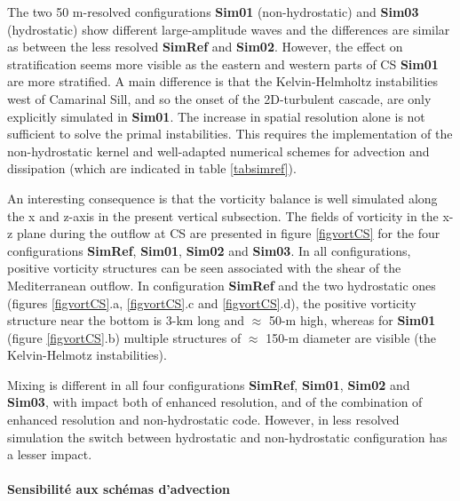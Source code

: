 The two 50 m-resolved configurations \textbf{Sim01} (non-hydrostatic) and \textbf{Sim03} (hydrostatic) show different large-amplitude waves and the differences are similar as between the less resolved \textbf{SimRef} and \textbf{Sim02}. However, the effect on stratification seems more visible as the eastern and western parts of CS \textbf{Sim01} are more stratified. A main difference is that the Kelvin-Helmholtz instabilities west of Camarinal Sill, and so the onset of the 2D-turbulent cascade, are only explicitly simulated in \textbf{Sim01}.
The increase in spatial resolution alone is not sufficient to solve the primal instabilities. This requires the implementation of the non-hydrostatic kernel and well-adapted numerical schemes for advection and dissipation (which are indicated in table \ref{tabsimref}).
 
An interesting consequence is that the vorticity balance is well simulated along the x and z-axis in the present vertical subsection. The fields of vorticity in the x-z plane during the outflow at CS are presented in figure \ref{figvortCS} for the four configurations \textbf{SimRef}, \textbf{Sim01}, \textbf{Sim02} and \textbf{Sim03}. In all configurations, positive vorticity structures can be seen associated with the shear of the Mediterranean outflow. In configuration \textbf{SimRef} and the two hydrostatic ones (figures \ref{figvortCS}.a, \ref{figvortCS}.c and \ref{figvortCS}.d), the positive vorticity structure near the bottom is 3-km long and $\approx$ 50-m high, whereas for \textbf{Sim01} (figure \ref{figvortCS}.b) multiple structures of $\approx$ 150-m diameter are visible (the Kelvin-Helmotz instabilities).
 
Mixing is different in all four configurations \textbf{SimRef}, \textbf{Sim01}, \textbf{Sim02} and \textbf{Sim03}, with impact  both of enhanced resolution, and of the combination of enhanced resolution and non-hydrostatic code. However, in less resolved simulation the switch between hydrostatic and non-hydrostatic configuration has a lesser impact.



\paragraph{Sensibilité aux schémas d'advection}

